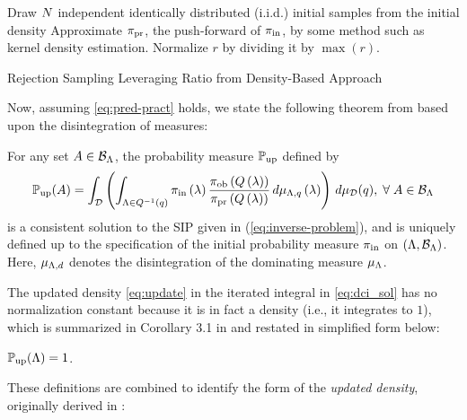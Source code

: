 \begin{algorithm}[hbtp]
\DontPrintSemicolon
Draw $N$ independent identically distributed (i.i.d.) initial samples from the initial density
	Approximate $\operatorname*{\pi_{pr}}$, the push-forward of $\operatorname*{\pi_{in}}$, by some method such as kernel density estimation.
  Normalize $r$ by dividing it by $\max(r)$.
 \caption{Rejection Sampling Leveraging Ratio from Density-Based Approach}
 \label{alg:rejection}
\end{algorithm}

Now, assuming \eqref{eq:pred-pract} holds, we state the following theorem from \cite{BJW18a} based upon the disintegration of measures:

\begin{thm}
  For any set $A\in \mathcal{B}_{{\Lambda}}$, the probability measure $\operatorname*{\mathbb{P}_{up}}$ defined by
  \begin{equation}\label{eq:dci_sol}
    \operatorname*{\mathbb{P}_{up}} (A) = \int_{\mathcal{D}} \left (  \int_{{\Lambda} \in Q^{-1}(q)}  \operatorname*{\pi_{in}}\left ( \lambda \right ) \frac{\operatorname*{\pi_{ob}}\left ( Q\left ( \lambda \right ) \right )}{\operatorname*{\pi_{pr}}\left ( Q\left ( \lambda \right ) \right )} \, d\mu_{{\Lambda}, q} \left ( \lambda \right ) \right ) \, d\mu_{\mathcal{D}}(q), \; \forall \; A \in \mathcal{B}_{{\Lambda}}
  \end{equation}
  is a consistent solution to the SIP given in (\ref{eq:inverse-problem}), and is uniquely defined up to the specification of the initial probability measure $\operatorname*{\pi_{in}}$ on $({\Lambda}, \mathcal{B}_{{\Lambda}})$.
  Here, $\mu_{{\Lambda}, d}$ denotes the disintegration of the dominating measure $\mu_{\Lambda}$.
\end{thm}

The updated density \eqref{eq:update} in the iterated integral in \eqref{eq:dci_sol} has no normalization constant because it is in fact a density (i.e., it integrates to $1$), which is summarized in Corollary 3.1 in \cite{BJW18} and restated in simplified form below:
\begin{cor}\label{cor:int}
$\operatorname*{\mathbb{P}_{up}}({\Lambda}) = 1$.
\end{cor}

These definitions are combined to identify the form of the \emph{updated density}, originally derived in \cite{BJW18}:

